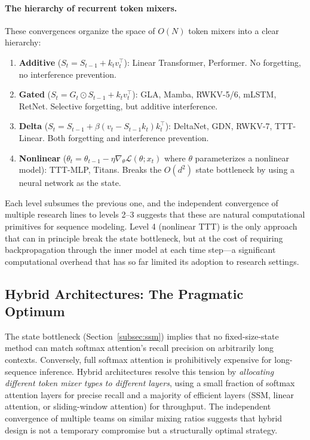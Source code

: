 \documentclass[11pt,a4paper]{article}
\begin{document}
\paragraph{The hierarchy of recurrent token mixers.}
These convergences organize the space of $O(N)$ token mixers into a clear hierarchy:
\begin{enumerate}[nosep]
\item \textbf{Additive} ($S_t = S_{t-1} + k_t v_t^\top$): Linear Transformer, Performer. No forgetting, no interference prevention.
\item \textbf{Gated} ($S_t = G_t \odot S_{t-1} + k_t v_t^\top$): GLA, Mamba, RWKV-5/6, mLSTM, RetNet. Selective forgetting, but additive interference.
\item \textbf{Delta} ($S_t = S_{t-1} + \beta(v_t - S_{t-1} k_t) k_t^\top$): DeltaNet, GDN, RWKV-7, TTT-Linear. Both forgetting and interference prevention.
\item \textbf{Nonlinear} ($\theta_t = \theta_{t-1} - \eta \nabla_\theta \mathcal{L}(\theta; x_t)$ where $\theta$ parameterizes a nonlinear model): TTT-MLP, Titans. Breaks the $O(d^2)$ state bottleneck by using a neural network as the state.
\end{enumerate}
Each level subsumes the previous one, and the independent convergence of multiple research lines to levels 2--3 suggests that these are natural computational primitives for sequence modeling. Level 4 (nonlinear TTT) is the only approach that can in principle break the state bottleneck, but at the cost of requiring backpropagation through the inner model at each time step---a significant computational overhead that has so far limited its adoption to research settings.



\subsection{Hybrid Architectures: The Pragmatic Optimum}
\label{subsec:hybrid}

The state bottleneck (Section~\ref{subsec:ssm}) implies that no fixed-size-state method can match softmax attention's recall precision on arbitrarily long contexts. Conversely, full softmax attention is prohibitively expensive for long-sequence inference. Hybrid architectures resolve this tension by \emph{allocating different token mixer types to different layers}, using a small fraction of softmax attention layers for precise recall and a majority of efficient layers (SSM, linear attention, or sliding-window attention) for throughput. The independent convergence of multiple teams on similar mixing ratios suggests that hybrid design is not a temporary compromise but a structurally optimal strategy.
\end{document}
